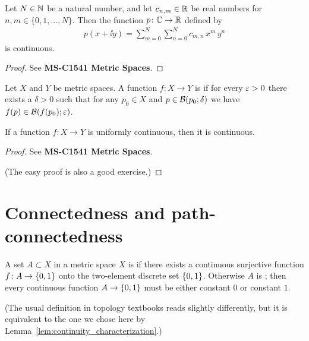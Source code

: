 \begin{corollary}
  \label{cor:multivariate_polynomial_continuous}
  Let $N \in \mathbb{N}$ be a natural number, and let
  $c_{n,m} \in \mathbb{R}$ be real numbers for $n,m \in \{0,1,\ldots,N\}$.
  Then the function $p \colon \mathbb{C} \to \mathbb{R}$ defined by
  \begin{align*}
    p(x + \ii y) = \sum_{m=0}^N \sum_{n=0}^N c_{m,n} \, x^m \, y^n
  \end{align*}
  is continuous.
\end{corollary}
\begin{proof}
  See \textbf{MS-C1541 Metric Spaces}.
\end{proof}

\begin{definition}
  \label{def:uniformly_continuous}
  Let $X$ and $Y$ be metric spaces.
  A function $f \colon X \to Y$ is  if
  for every $\varepsilon > 0$ there exists a $\delta > 0$ such that for
  any $p_0 \in X$ and $p \in \mathcal{B}(p_0; \delta)$
  we have $f(p) \in \mathcal{B}(f(p_0); \varepsilon)$.
\end{definition}

\begin{lemma}
  \label{lem:uniformly_continuous_implies_continuous}
  If a function $f \colon X \to Y$ is uniformly continuous, then it is continuous.
\end{lemma}
\begin{proof}
  See \textbf{MS-C1541 Metric Spaces}.

  (The easy proof is also a good exercise.)
\end{proof}


\section{Connectedness and path-connectedness}

\begin{definition}[Connectedness]
  \label{def:connected}
  A set $A \subset X$ in a metric space $X$
  is  if there exists
  a continuous surjective function
  $f \colon A \to \left\{ 0,1 \right\}$ onto the two-element discrete
  set $\left\{ 0,1 \right\}$.
  Otherwise $A$ is ;
  then every continuous function $A \to \left\{ 0,1 \right\}$ must be
  either constant $0$ or constant $1$.

  (The usual definition in topology textbooks reads
  slightly differently, but it is
  equivalent to the one we chose here by
  Lemma~\ref{lem:continuity_characterization}.)
\end{definition}

